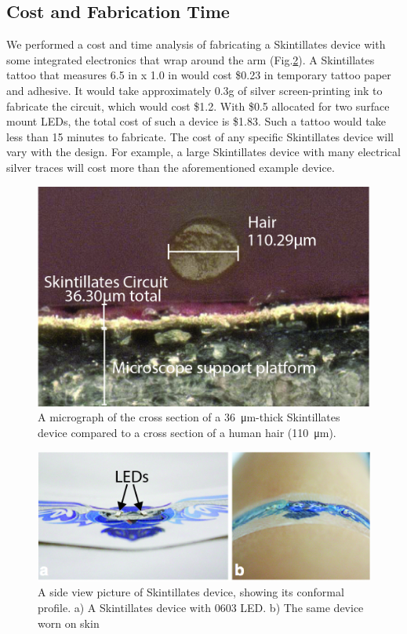 \documentclass{sigchi}
\begin{document}
\subsection{Cost and Fabrication Time}
We performed a cost and time analysis of fabricating a Skintillates device with some integrated electronics that wrap around the arm (Fig.\ref{fig:LED0603}). A Skintillates tattoo that measures 6.5 in x 1.0 in would cost \$0.23 in temporary tattoo paper and adhesive. It would take approximately 0.3g of silver screen-printing ink to fabricate the circuit, which would cost \$1.2. With \$0.5 allocated for two surface mount LEDs, the total cost of such a device is \$1.83. Such a tattoo would take less than 15 minutes to fabricate. The cost of any specific Skintillates device will vary with the design. For example, a large Skintillates device with many electrical silver traces will cost more than the aforementioned example device.  

\begin{figure}[!ht]
\centering
\includegraphics[width=1\columnwidth]{figures/Figure2}
\caption{A micrograph of the cross section of a \SI{36}{\micro\metre}-thick Skintillates device compared to a cross section of a human hair (\SI{110}{\micro\metre}).}
\vspace{-8pt}
\label{fig:micrograph}
\end{figure}

\begin{figure}
\centering
\includegraphics[width=1\columnwidth]{figures/LED0603}
\caption{A side view picture of Skintillates device, showing its conformal profile. a) A Skintillates device with 0603 LED. b) The same device worn on skin}
\vspace{-8pt}
\label{fig:LED0603}
\end{figure}
\end{document}
